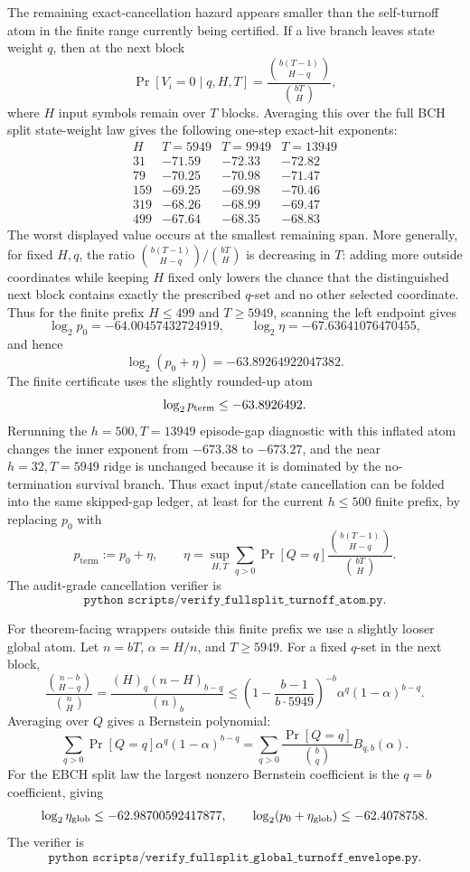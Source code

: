 The remaining exact-cancellation hazard appears smaller than the self-turnoff atom in the finite range currently being
certified.  If a live branch leaves state weight \(q\), then at the next block
\[
\Pr[V_i=0\mid q,H,T]
=
\frac{\binom{b(T-1)}{H-q}}{\binom{bT}{H}},
\]
where \(H\) input symbols remain over \(T\) blocks.  Averaging this over the full BCH split state-weight law gives the
following one-step exact-hit exponents:
\[
\begin{array}{c|c|c|c}
H & T=5949 & T=9949 & T=13949\\
\hline
31 & -71.59 & -72.33 & -72.82\\
79 & -70.25 & -70.98 & -71.47\\
159 & -69.25 & -69.98 & -70.46\\
319 & -68.26 & -68.99 & -69.47\\
499 & -67.64 & -68.35 & -68.83
\end{array}
\]
The worst displayed value occurs at the smallest remaining span.  More generally, for fixed \(H,q\), the ratio
\(\binom{b(T-1)}{H-q}/\binom{bT}{H}\) is decreasing in \(T\): adding more outside coordinates while keeping \(H\)
fixed only lowers the chance that the distinguished next block contains exactly the prescribed \(q\)-set and no other
selected coordinate.  Thus for the finite prefix \(H\le499\) and \(T\ge5949\), scanning the left endpoint gives
\[
\log_2 p_0=-64.00457432724919,\qquad
\log_2\eta=-67.63641076470455,
\]
and hence
\[
\log_2(p_0+\eta)=-63.89264922047382.
\]
The finite certificate uses the slightly rounded-up atom
\[
\log_2 p_{\rm term}\le -63.8926492.
\]
Rerunning the \(h=500,T=13949\) episode-gap diagnostic with this inflated atom changes the inner exponent from
\(-673.38\) to \(-673.27\), and the near \(h=32,T=5949\) ridge is unchanged because it is dominated by the
no-termination survival branch.  Thus exact input/state cancellation can be folded into the same skipped-gap ledger,
at least for the current \(h\le500\) finite prefix, by replacing \(p_0\) with
\[
p_{\mathrm{term}}:=p_0+\eta,\qquad
\eta=\sup_{H,T}\sum_{q>0}\Pr[Q=q]\frac{\binom{b(T-1)}{H-q}}{\binom{bT}{H}}.
\]
The audit-grade cancellation verifier is
\[
\texttt{python scripts/verify\_fullsplit\_turnoff\_atom.py}.
\]

For theorem-facing wrappers outside this finite prefix we use a slightly looser global atom.  Let \(n=bT\),
\(\alpha=H/n\), and \(T\ge5949\).  For a fixed \(q\)-set in the next block,
\[
\frac{\binom{n-b}{H-q}}{\binom{n}{H}}
=\frac{(H)_q(n-H)_{b-q}}{(n)_b}
\le
\left(1-\frac{b-1}{b\cdot5949}\right)^{-b}
\alpha^q(1-\alpha)^{b-q}.
\]
Averaging over \(Q\) gives a Bernstein polynomial:
\[
\sum_{q>0}\Pr[Q=q]\alpha^q(1-\alpha)^{b-q}
=
\sum_{q>0}\frac{\Pr[Q=q]}{\binom bq}B_{q,b}(\alpha).
\]
For the EBCH split law the largest nonzero Bernstein coefficient is the \(q=b\) coefficient, giving
\[
\log_2\eta_{\rm glob}\le -62.98700592417877,\qquad
\log_2(p_0+\eta_{\rm glob})\le -62.4078758.
\]
The verifier is
\[
\texttt{python scripts/verify\_fullsplit\_global\_turnoff\_envelope.py}.
\]

